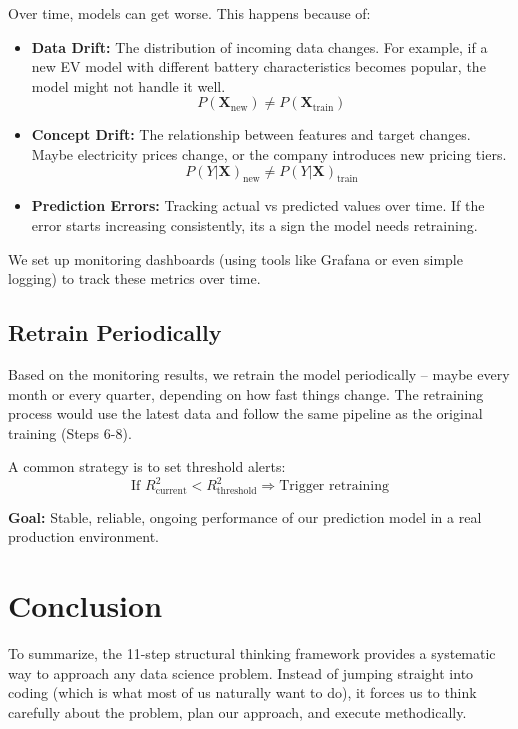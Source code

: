 \documentclass[12pt, a4paper]{article}
\begin{document}
Over time, models can get worse. This happens because of:

\begin{itemize}
    \item \textbf{Data Drift:} The distribution of incoming data changes. For example, if a new EV model with different battery characteristics becomes popular, the model might not handle it well.
    $$P(\mathbf{X}_{\text{new}}) \neq P(\mathbf{X}_{\text{train}})$$
    
    \item \textbf{Concept Drift:} The relationship between features and target changes. Maybe electricity prices change, or the company introduces new pricing tiers.
    $$P(Y|\mathbf{X})_{\text{new}} \neq P(Y|\mathbf{X})_{\text{train}}$$
    
    \item \textbf{Prediction Errors:} Tracking actual vs predicted values over time. If the error starts increasing consistently, its a sign the model needs retraining.
\end{itemize}

We set up monitoring dashboards (using tools like Grafana or even simple logging) to track these metrics over time.

\subsection{Retrain Periodically}

Based on the monitoring results, we retrain the model periodically -- maybe every month or every quarter, depending on how fast things change. The retraining process would use the latest data and follow the same pipeline as the original training (Steps 6-8).

A common strategy is to set threshold alerts:
$$\text{If } R^2_{\text{current}} < R^2_{\text{threshold}} \Rightarrow \text{Trigger retraining}$$

\textbf{Goal:} Stable, reliable, ongoing performance of our prediction model in a real production environment.

\newpage

\section{Conclusion}

To summarize, the 11-step structural thinking framework provides a systematic way to approach any data science problem. Instead of jumping straight into coding (which is what most of us naturally want to do), it forces us to think carefully about the problem, plan our approach, and execute methodically.
\end{document}
